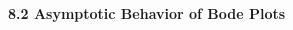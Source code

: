 \documentclass[landscape,a4paper]{extarticle}
\newenvironment{Figure}
  {\noindent\minipage{\linewidth}}
  {\endminipage\par\medskip}
\begin{document}
\begin{multicols*}{5}
    \leavevmode\\






    \textbf{8.2 Asymptotic Behavior of Bode Plots}


\end{multicols*}
\end{document}
